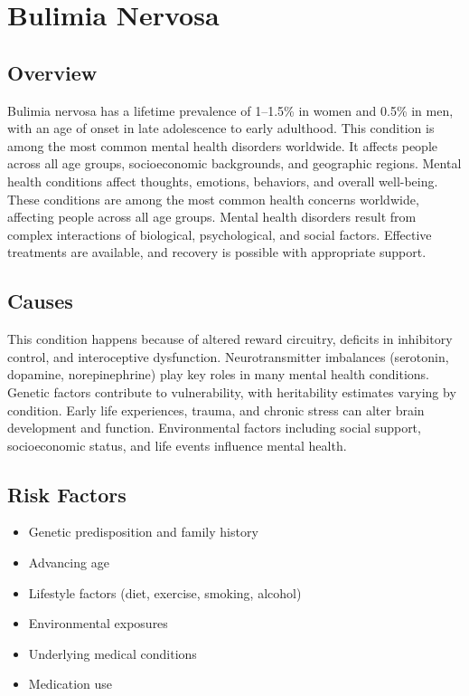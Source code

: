 \chapter{Bulimia Nervosa}
\label{sec:Bulimia Nervosa}

\section{Overview}
Bulimia nervosa has a lifetime prevalence of 1--1.5\% in women and 0.5\% in men, with an age of onset in late adolescence to early adulthood. This condition is among the most common mental health disorders worldwide. It affects people across all age groups, socioeconomic backgrounds, and geographic regions. Mental health conditions affect thoughts, emotions, behaviors, and overall well-being. These conditions are among the most common health concerns worldwide, affecting people across all age groups. Mental health disorders result from complex interactions of biological, psychological, and social factors. Effective treatments are available, and recovery is possible with appropriate support.
\section{Causes}
This condition happens because of altered reward circuitry, deficits in inhibitory control, and interoceptive dysfunction.  Neurotransmitter imbalances (serotonin, dopamine, norepinephrine) play key roles in many mental health conditions. Genetic factors contribute to vulnerability, with heritability estimates varying by condition. Early life experiences, trauma, and chronic stress can alter brain development and function. Environmental factors including social support, socioeconomic status, and life events influence mental health.   
\section{Risk Factors}
\begin{itemize}[noitemsep]
  \item Genetic predisposition and family history
  \item Advancing age
  \item Lifestyle factors (diet, exercise, smoking, alcohol)
  \item Environmental exposures
  \item Underlying medical conditions
  \item Medication use
\end{itemize}

